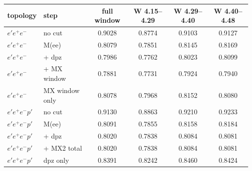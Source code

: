 \begin{tabular}{llcccc}\toprule
topology & step & full window & W 4.15--4.29 & W 4.29--4.40 & W 4.40--4.48 \\\midrule
$e'e^+e^-$ & no cut & 0.9028 & 0.8774 & 0.9103 & 0.9127 \\
$e'e^+e^-$ & M(ee) & 0.8079 & 0.7851 & 0.8145 & 0.8169 \\
$e'e^+e^-$ & + dpz & 0.7986 & 0.7762 & 0.8023 & 0.8099 \\
$e'e^+e^-$ & + MX window & 0.7881 & 0.7731 & 0.7924 & 0.7940 \\
$e'e^+e^-$ & MX window only & 0.8078 & 0.7968 & 0.8152 & 0.8080 \\
\midrule
$e'e^+e^-p'$ & no cut & 0.9130 & 0.8863 & 0.9210 & 0.9233 \\
$e'e^+e^-p'$ & M(ee) & 0.8091 & 0.7855 & 0.8158 & 0.8184 \\
$e'e^+e^-p'$ & + dpz & 0.8020 & 0.7838 & 0.8084 & 0.8081 \\
$e'e^+e^-p'$ & + MX2 total & 0.8020 & 0.7838 & 0.8084 & 0.8081 \\
$e'e^+e^-p'$ & dpz only & 0.8391 & 0.8242 & 0.8460 & 0.8424 \\
\bottomrule\end{tabular}
